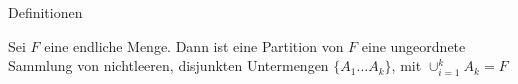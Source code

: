 \begin{section}{Definitionen}
\begin{Definition}
   Sei $F$ eine endliche Menge. Dann ist eine Partition von $F$ eine ungeordnete Sammlung von nichtleeren, disjunkten Untermengen $\{A_1 ... A_k\}$, mit $\cup_{i=1}^{k}A_k = F$
\end{Definition}
\end{section}